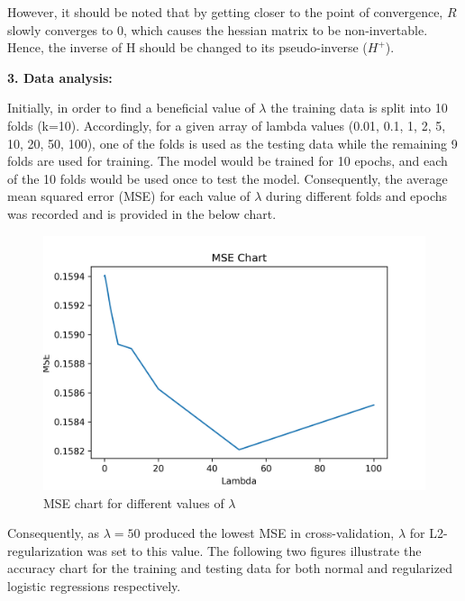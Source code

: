 \documentclass[12pt,a4paper]{article}
\begin{document}
	\vspace{-0.2cm}
	\noindent However, it should be noted that by getting closer to the point of convergence, $R$ slowly converges to 0, which causes the hessian matrix to be non-invertable. Hence, the inverse of H should be changed to its pseudo-inverse ($H^+$).
	
	\newpage
	\noindent \textbf{3. Data analysis:}
	\vspace{0.2cm}
	
	\noindent Initially, in order to find a beneficial value of $\lambda$ the training data is split into 10 folds (k=10). Accordingly, for a given array of lambda values ({0.01, 0.1, 1, 2, 5, 10, 20, 50, 100}), one of the folds is used as the testing data while the remaining 9 folds are used for training. The model would be trained for 10 epochs, and each of the 10 folds would be used once to test the model. Consequently, the average mean squared error (MSE) for each value of $\lambda$ during different folds and epochs was recorded and is provided in the below chart.
	
	\vspace{-0.6cm}
	\begin{figure}[H]
		\centering
		\includegraphics[scale=.63]{Figures/MSE}
		\caption{MSE chart for different values of $\lambda$}
	\end{figure}

	\vspace{-0.3cm}
	\noindent Consequently, as $\lambda = 50$ produced the lowest MSE in cross-validation, $\lambda$ for L2-regularization was set to this value. The following two figures illustrate the accuracy chart for the training and testing data for both normal and regularized logistic regressions respectively.
\end{document}
